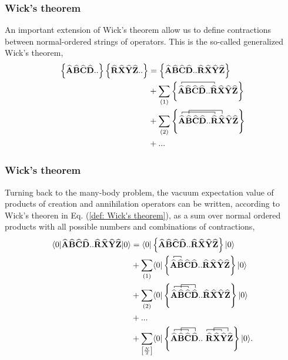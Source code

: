 \documentclass[compress]{beamer}
\newcommand*{\for}[3]{\langle#1|#2|#3\rangle}
\newcommand*{\kpr}[1]{\left\{#1\right\}}
\newcommand{\OP}[1]{{\bf\widehat{#1}}}
\newcommand*{\fpr}[1]{\left[#1\right]}
\newcommand*{\pr}[1]{\left(#1\right)}
\begin{document}
\frame
{
  \frametitle{Wick's theorem}
\begin{small}
{\scriptsize
An important extension of Wick's theorem allow us to define contractions between normal-ordered strings of operators. This is the so-called generalized Wick's theorem,
\begin{align}
\label{def: Generalized Wick's theorem}
\kpr{\OP{A}\OP{B}\OP{C}\OP{D}..}\kpr{\OP{R}\OP{X}\OP{Y}\OP{Z}..} &= \kpr{\OP{A}\OP{B}\OP{C}\OP{D}..\OP{R}\OP{X}\OP{Y}\OP{Z}}\\
&+ \sum_{\pr{1}} \kpr{ 
\contraction[0.5ex]{}{\OP{A}}{\OP{B}\OP{C}\OP{D}..}{\OP{R}} \OP{A}\OP{B}\OP{C}\OP{D}..\OP{R}\OP{X}\OP{Y}\OP{Z}}\\
&+ \sum_{\pr{2}} \kpr{\contraction[0.5ex]{}{\OP{A}}{\OP{B}\OP{C}\OP{D}..}{\OP{R}}\contraction[1.0ex]{\OP{A}}{\OP{B}}{\OP{C}\OP{D}..\OP{R}}{\OP{X}}\OP{A}\OP{B}\OP{C}\OP{D}..\OP{R}\OP{X}\OP{Y}\OP{Z}}\\
&+ ...
\end{align}
}
\end{small}
}

\frame
{
  \frametitle{Wick's theorem}
\begin{small}
{\scriptsize
Turning back to the many-body problem, the vacuum expectation value of products of creation and annihilation operators can be written, according to Wick's theoren in Eq. (\ref{def: Wick's theorem}), as a sum over normal ordered products with all possible numbers and combinations of contractions,
\begin{align}
\for{0}{\OP{A}\OP{B}\OP{C}\OP{D}..\OP{R}\OP{X}\OP{Y}\OP{Z}}{0} &= \for{0}{\kpr{\OP{A}\OP{B}\OP{C}\OP{D}..\OP{R}\OP{X}\OP{Y}\OP{Z}}}{0}\\
&+ \sum_{\pr{1}} \for{0}{\kpr{\contraction[0.5ex]{}{\OP{A}}{}{\OP{B}} \OP{A}\OP{B}\OP{C}\OP{D}..\OP{R}\OP{X}\OP{Y}\OP{Z}}}{0}\\
&+ \sum_{\pr{2}}\for{0}{\kpr{\contraction[0.5ex]{}{\OP{A}}{\OP{B}}{\OP{C}}\contraction[1.0ex]{\OP{A}}{\OP{B}}{\OP{C}}{\OP{D}}\OP{A}\OP{B}\OP{C}\OP{D}..\OP{R}\OP{X}\OP{Y}\OP{Z}}}{0}\\
&+ ... \\
&+ \sum_{\fpr{\frac{N}{2}}} \for{0}{\kpr{\contraction[0.5ex]{}{\OP{A}}{\OP{B}}{\OP{C}}\contraction[1.0ex]{\OP{A}}{\OP{B}}{\OP{C}}{\OP{D}} \OP{A}\OP{B}\OP{C}\OP{D}..\contraction[0.5ex]{}{\OP{R}}{\OP{X}}{\OP{Y}}\contraction[1.0ex]{\OP{R}}{\OP{X}}{\OP{Y}}{\OP{Z}}\ \OP{R}\OP{X}\OP{Y}\OP{Z}}}{0}.
\end{align}
}
\end{small}
}
\end{document}
